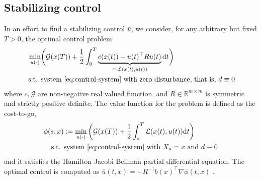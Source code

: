\documentclass[letterpaper, 10 pt, conference]{ieeeconf}  %
\newtheorem{remark}{Remark}
\newcommand{\tp}{^\top}
\newcommand{\inv}{^{-1}}
\newcommand{\R}{\mathbb{R}}
\newcommand{\half}{\frac{1}{2}}
\newcommand{\ud}{\mathrm{d}}
\newcommand{\G}{\mathcal{G}}
\newcommand{\grad}{\nabla}
\renewcommand{\L}{\mathcal{L}}
\begin{document}
\subsection{Stabilizing control}
In an effort to find a stabilizing control $\bar{u}$, we consider, for any arbitrary but fixed $T > 0$, the optimal control problem
\begin{subequations}\label{eq:nLQR}
\begin{align}
\min_{u(\cdot)} & \bigg( \mathcal{G}(x(T)) + \half \int_{0}^{T} \underbrace{c(x(t)) + u(t)\tp R u(t)}_{=: \L(x(t),u(t))} \ud t \bigg) \\
\text{ s.t. } & \text{system }\eqref{eq:control-system} \text{ with zero disturbance, that is, } d \equiv 0
\end{align}
\end{subequations}
where $c,\G$ are non-negative real valued function, and $R \in \R^{m \times m}$ is symmetric and strictly positive definite. The value function for the problem is defined as the cost-to-go,
\begin{align*}
    \phi(s,x) &:= \min_{u(\cdot)}  \bigg( \mathcal{G}(x(T)) + \half \int_{s}^{T} \L(x(t),u(t)) \ud t \bigg) \\
\text{ s.t. } & \text{system }\eqref{eq:control-system} \text{ with } X_s = x \text{ and } d \equiv 0
\end{align*}
and it satisfies the Hamilton Jacobi Bellman partial differential equation. The optimal control is computed as $\bar{u}(t,x) = -R\inv b(x)\tp \grad \phi(t,x)$ \cite{liberzon}. 
\end{document}
